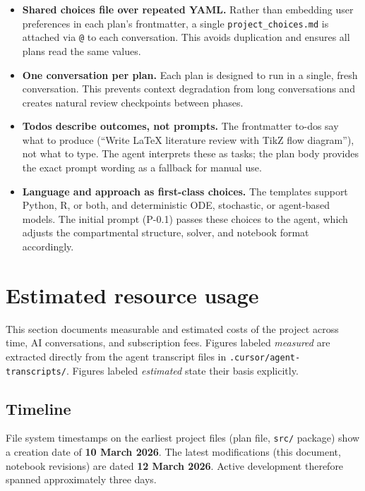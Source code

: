 \documentclass[11pt]{article}
\begin{document}
\begin{itemize}
  \item \textbf{Shared choices file over repeated YAML.} Rather than embedding user preferences in each plan's frontmatter, a single \texttt{project\_choices.md} is attached via \texttt{@} to each conversation. This avoids duplication and ensures all plans read the same values.

  \item \textbf{One conversation per plan.} Each plan is designed to run in a single, fresh conversation. This prevents context degradation from long conversations and creates natural review checkpoints between phases.

  \item \textbf{Todos describe outcomes, not prompts.} The frontmatter to-dos say what to produce (``Write LaTeX literature review with TikZ flow diagram''), not what to type. The agent interprets these as tasks; the plan body provides the exact prompt wording as a fallback for manual use.

  \item \textbf{Language and approach as first-class choices.} The templates support Python, R, or both, and deterministic ODE, stochastic, or agent-based models. The initial prompt (P-0.1) passes these choices to the agent, which adjusts the compartmental structure, solver, and notebook format accordingly.
\end{itemize}

\section{Estimated resource usage}

This section documents measurable and estimated costs of the project across time, AI conversations, and subscription fees. Figures labeled \textit{measured} are extracted directly from the agent transcript files in \texttt{.cursor/agent-transcripts/}. Figures labeled \textit{estimated} state their basis explicitly.

\subsection{Timeline}

File system timestamps on the earliest project files (plan file, \texttt{src/} package) show a creation date of \textbf{10 March 2026}. The latest modifications (this document, notebook revisions) are dated \textbf{12 March 2026}. Active development therefore spanned approximately three days.
\end{document}
